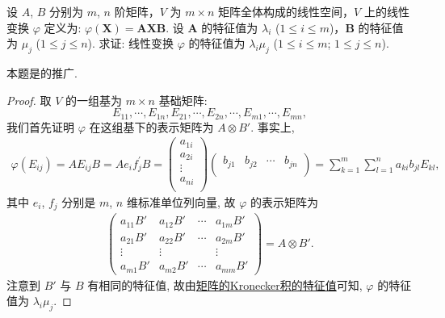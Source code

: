 \documentclass[../../main.tex]{subfiles}
\begin{document}
\begin{proposition}\label{proposition:线性变换AXB的特征值}
设 $A$, $B$ 分别为 $m$, $n$ 阶矩阵，$V$ 为 $m\times n$ 矩阵全体构成的线性空间，$V$ 上的线性变换 $\varphi$ 定义为: $\varphi(\boldsymbol{X}) = \boldsymbol{A}\boldsymbol{X}\boldsymbol{B}$. 设 $\boldsymbol{A}$ 的特征值为 $\lambda_i$ ($1\leqslant  i\leqslant  m$)，$\boldsymbol{B}$ 的特征值为 $\mu_j$ ($1\leqslant  j\leqslant  n$). 求证: 线性变换 $\varphi$ 的特征值为 $\lambda_i\mu_j$ ($1\leqslant  i\leqslant  m$; $1\leqslant  j\leqslant  n$). 
\end{proposition}
\begin{remark}
本题是的推广.
\end{remark}
\begin{proof}
取 $V$ 的一组基为 $m\times n$ 基础矩阵:
\[
E_{11},\cdots,E_{1n},E_{21},\cdots,E_{2n},\cdots,E_{m1},\cdots,E_{mn},
\]
我们首先证明 $\varphi$ 在这组基下的表示矩阵为 $A\otimes B'$. 事实上,
\begin{align*}
\varphi (E_{ij})=AE_{ij}B=Ae_if_{j}^{\prime}B=\left( \begin{array}{c}
a_{1i}\\
a_{2i}\\
\vdots\\
a_{ni}\\
\end{array} \right) \left( \begin{matrix}
b_{j1}&		b_{j2}&		\cdots&		b_{jn}\\
\end{matrix} \right) =\sum_{k=1}^m{\sum_{l=1}^n{a_{ki}b_{jl}E_{kl},}}
\end{align*}
其中 $e_{i}$, $f_{j}$ 分别是 $m$, $n$ 维标准单位列向量, 故 $\varphi$ 的表示矩阵为
\begin{align*}
\begin{pmatrix}
a_{11}B' & a_{12}B' & \cdots & a_{1m}B' \\
a_{21}B' & a_{22}B' & \cdots & a_{2m}B' \\
\vdots & \vdots & & \vdots \\
a_{m1}B' & a_{m2}B' & \cdots & a_{mm}B'
\end{pmatrix}=A\otimes B'.
\end{align*}
注意到 $B'$ 与 $B$ 有相同的特征值, 故由\hyperref[proposition:矩阵的Kronecker积的特征值]{矩阵的Kronecker积的特征值}可知, $\varphi$ 的特征值为 $\lambda_{i}\mu_{j}$.

\end{proof}
\end{document}
